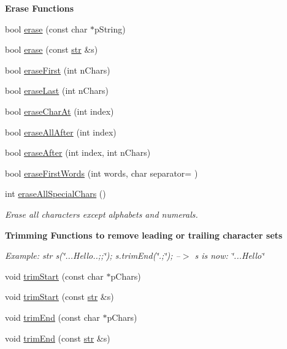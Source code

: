 \begin{Indent}{\bf Erase Functions}\par
\begin{DoxyCompactItemize}
\item 
bool \hyperlink{classstr_ac6317ff3358c405969d8321abf57576a}{erase} (const char $\ast$p\+String)
\item 
bool \hyperlink{classstr_ac6aa5f1cf689a0517fd7ba1067e29acf}{erase} (const \hyperlink{classstr}{str} \&s)
\item 
bool \hyperlink{classstr_aa3f63b8a3c5303826483a3edde52502d}{erase\+First} (int n\+Chars)
\item 
bool \hyperlink{classstr_ab538a2b5175d4dce0d6a0293ed75df1e}{erase\+Last} (int n\+Chars)
\item 
bool \hyperlink{classstr_afc30c047b80529af3776660afab89746}{erase\+Char\+At} (int index)
\item 
bool \hyperlink{classstr_a351218d6e702b94089dc4e022d8eb3c1}{erase\+All\+After} (int index)
\item 
bool \hyperlink{classstr_af493a7613ecafae22a43323a9adb0ce4}{erase\+After} (int index, int n\+Chars)
\item 
bool \hyperlink{classstr_a7a8f53b6984ad56246e821b7fb2c7e29}{erase\+First\+Words} (int words, char separator= \textquotesingle{} \textquotesingle{})
\item 
int \hyperlink{classstr_add83119573c1104fe2729c027cefafe7}{erase\+All\+Special\+Chars} ()
\begin{DoxyCompactList}\small\item\em Erase all characters except alphabets and numerals. \end{DoxyCompactList}\end{DoxyCompactItemize}
\end{Indent}
\begin{Indent}{\bf Trimming Functions to remove leading or trailing character sets}\par
{\em Example\+: str s(\char`\"{}...\+Hello..;;\textquotesingle{}\textquotesingle{}\char`\"{}); s.\+trim\+End(\char`\"{}.;\textquotesingle{}\char`\"{}); --$>$ s is now\+: \char`\"{}...\+Hello\char`\"{} }\begin{DoxyCompactItemize}
\item 
void \hyperlink{classstr_af39c84a11852795391135b5a321dba68}{trim\+Start} (const char $\ast$p\+Chars)
\item 
void \hyperlink{classstr_ace91c437810633e6bc22bd2f2cc775ad}{trim\+Start} (const \hyperlink{classstr}{str} \&s)
\item 
void \hyperlink{classstr_ac6cb12c86533878ede9984e50b1a1efb}{trim\+End} (const char $\ast$p\+Chars)
\item 
void \hyperlink{classstr_a221427595db8f5ead16db4c6be08313f}{trim\+End} (const \hyperlink{classstr}{str} \&s)
\end{DoxyCompactItemize}
\end{Indent}
